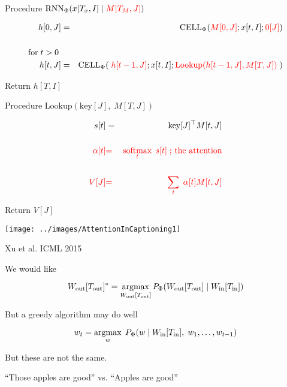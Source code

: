 {

Procedure $\mathrm{RNN}_\Phi(x[T_x,I] \;|\; {\color{red} M[T_M,J]})$

\begin{eqnarray*}
h[0,J] & = & \mathrm{CELL}_\Phi({\color{red} M[0,J]};x[t,I];{\color{red} 0[J]}) \\
\\
\mbox{for}\;t > 0\;\\
h[t,J] & = & \mathrm{CELL}_\Phi(\;{\color{red} h[t-1,J]};x[t,I];{\color{red}\mathrm{Lookup}(h[t-1,J],M[T,J])}\;)\\
\end{eqnarray*}

Return $h[T,I]$


Procedure $\mathrm{Lookup}(\mathrm{key}[J],\;M[T,J])$

\bigskip
\begin{eqnarray*}
s[t] & = &\mathrm{key}[J]^\top M[t,J] \\
\\
{\color{red} \alpha[t]} & {\color{red} =} & {\color{red} \operatorname*{softmax}_t \;s[t]\;\mbox{; the attention}} \\
\\
{\color{red} V[J]} & {\color{red} =} & {\color{red} \sum_t\;\alpha[t]M[t,J]}
\end{eqnarray*}

\bigskip
Return $V[J]$




\centerline{\texttt{[image: ../images/AttentionInCaptioning1]}}
\centerline{Xu et al. ICML 2015}


We would like

\vfill
$$W_{\mathrm{out}}[T_{\mathrm{out}}]^* = \operatorname*{argmax}_{W_{\mathrm{out}}[T_{\mathrm{out}}]}
P_\Phi(W_{\mathrm{out}}[T_{\mathrm{out}}] \;|\;W_{\mathrm{in}}[T_{\mathrm{in}}])$$

\vfill
But a greedy algorithm may do well

\vfill
$$w_t = \operatorname*{argmax}_w\; P_\Phi(w\;|\;W_{\mathrm{in}}[T_{\mathrm{in}}],\;w_1,\ldots,w_{t-1})$$

\vfill
But these are not the same.


``Those apples are good'' vs. ``Apples are good''

}
